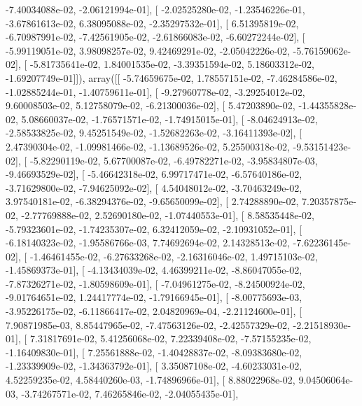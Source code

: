 \documentclass{article}
\begin{document}
         -7.40034088e-02,  -2.06121994e-01],
       [ -2.02525280e-02,  -1.23546226e-01,  -3.67861613e-02,
          6.38095088e-02,  -2.35297532e-01],
       [  6.51395819e-02,  -6.70987991e-02,  -7.42561905e-02,
         -2.61866083e-02,  -6.60272244e-02],
       [ -5.99119051e-02,   3.98098257e-02,   9.42469291e-02,
         -2.05042226e-02,  -5.76159062e-02],
       [ -5.81735641e-02,   1.84001535e-02,  -3.39351594e-02,
          5.18603312e-02,  -1.69207749e-01]]), array([[ -5.74659675e-02,   1.78557151e-02,  -7.46284586e-02,
         -1.02885244e-01,  -1.40759611e-01],
       [ -9.27960778e-02,  -3.29254012e-02,   9.60008503e-02,
          5.12758079e-02,  -6.21300036e-02],
       [  5.47203890e-02,  -1.44355828e-02,   5.08660037e-02,
         -1.76571571e-02,  -1.74915015e-01],
       [ -8.04624913e-02,  -2.58533825e-02,   9.45251549e-02,
         -1.52682263e-02,  -3.16411393e-02],
       [  2.47390304e-02,  -1.09981466e-02,  -1.13689526e-02,
          5.25500318e-02,  -9.53151423e-02],
       [ -5.82290119e-02,   5.67700087e-02,  -6.49782271e-02,
         -3.95834807e-03,  -9.46693529e-02],
       [ -5.46642318e-02,   6.99717471e-02,  -6.57640186e-02,
         -3.71629800e-02,  -7.94625092e-02],
       [  4.54048012e-02,  -3.70463249e-02,   3.97540181e-02,
         -6.38294376e-02,  -9.65650099e-02],
       [  2.74288890e-02,   7.20357875e-02,  -2.77769888e-02,
          2.52690180e-02,  -1.07440553e-01],
       [  8.58535448e-02,  -5.79323601e-02,  -1.74235307e-02,
          6.32412059e-02,  -2.10931052e-01],
       [ -6.18140323e-02,  -1.95586766e-03,   7.74692694e-02,
          2.14328513e-02,  -7.62236145e-02],
       [ -1.46461455e-02,  -6.27633268e-02,  -2.16316046e-02,
          1.49715103e-02,  -1.45869373e-01],
       [ -4.13434039e-02,   4.46399211e-02,  -8.86047055e-02,
         -7.87326271e-02,  -1.80598609e-01],
       [ -7.04961275e-02,  -8.24500924e-02,  -9.01764651e-02,
          1.24417774e-02,  -1.79166945e-01],
       [ -8.00775693e-03,  -3.95226175e-02,  -6.11866417e-02,
          2.04820969e-04,  -2.21124600e-01],
       [  7.90871985e-03,   8.85447965e-02,  -7.47563126e-02,
         -2.42557329e-02,  -2.21518930e-01],
       [  7.31817691e-02,   5.41256068e-02,   7.22339408e-02,
         -7.57155235e-02,  -1.16409830e-01],
       [  7.25561888e-02,  -1.40428837e-02,  -8.09383680e-02,
         -1.23339909e-02,  -1.34363792e-01],
       [  3.35087108e-02,  -4.60233031e-02,   4.52259235e-02,
          4.58440260e-03,  -1.74896966e-01],
       [  8.88022968e-02,   9.04506064e-03,  -3.74267571e-02,
          7.46265846e-02,  -2.04055435e-01],
\end{document}

